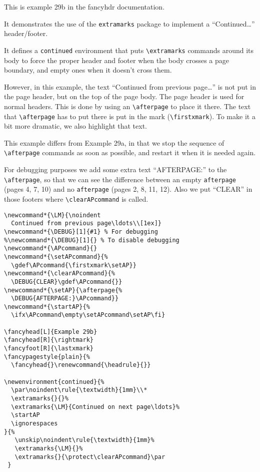 \documentclass{report}
\newcommand*{\LM}{\noindent
  Continued from previous page\ldots\\[1ex]}
\newcommand*{\DEBUG}[1]{#1} %
\newcommand*{\APcommand}{}
\newcommand*{\setAPcommand}{%
  \gdef\APcommand{\firstxmark\setAP}}
\newcommand*{\clearAPcommand}{%
  \DEBUG{CLEAR}\gdef\APcommand{}}
\newcommand*{\setAP}{\afterpage{%
  \DEBUG{AFTERPAGE:}\APcommand}}
\newcommand*{\startAP}{%
  \ifx\APcommand\empty\setAPcommand\setAP\fi}
\begin{document}
\tableofcontents

\thispagestyle{plain}

\bigskip

\noindent
\begin{boxedminipage}{\textwidth}
This is example 29b in the fancyhdr documentation.

It demonstrates the use of the \texttt{extramarks} package to implement
a ``Continued\ldots'' header/footer.

It defines a \texttt{continued} environment that puts \verb|\extramarks| commands around its body to force the proper header and footer when the body crosses a page boundary, and empty ones when it doesn't cross them.

However, in this example, the text ``Continued from previous page\ldots'' is not put in the page header, but on the top of the page body. The page header is used for normal headers. This is done by using an \verb|\afterpage| to place it there. The text that \verb|\afterpage| has to put there is put in the mark (\verb|\firstxmark|). To make it a bit more dramatic, we also highlight that text.

This example differs from Example 29a, in that we stop the sequence of \verb|\afterpage| commands as soon as possible, and restart it when it is needed again.
\end{boxedminipage}

\noindent
\begin{boxedminipage}{\textwidth}
For debugging purposes we add some extra text ``AFTERPAGE:'' to the \verb|\afterpage|, so that we can see the difference between an empty \texttt{afterpage} (pages 4, 7, 10) and no \texttt{afterpage} (pages 2, 8, 11, 12). Also we put ``CLEAR'' in those footers where \verb|\clearAPcommand| is called.

\begin{verbatim}
\newcommand*{\LM}{\noindent
  Continued from previous page\ldots\\[1ex]}
\newcommand*{\DEBUG}[1]{#1} % For debugging
%\newcommand*{\DEBUG}[1]{} % To disable debugging
\newcommand*{\APcommand}{}
\newcommand*{\setAPcommand}{%
  \gdef\APcommand{\firstxmark\setAP}}
\newcommand*{\clearAPcommand}{%
  \DEBUG{CLEAR}\gdef\APcommand{}}
\newcommand*{\setAP}{\afterpage{%
  \DEBUG{AFTERPAGE:}\APcommand}}
\newcommand*{\startAP}{%
  \ifx\APcommand\empty\setAPcommand\setAP\fi}

\fancyhead[L]{Example 29b}
\fancyhead[R]{\rightmark}
\fancyfoot[R]{\lastxmark}
\fancypagestyle{plain}{%
  \fancyhead{}\renewcommand{\headrule}{}}

\newenvironment{continued}{%
  \par\noindent\rule{\textwidth}{1mm}\\*
  \extramarks{}{}%
  \extramarks{\LM}{Continued on next page\ldots}%
  \startAP
  \ignorespaces
}{%
   \unskip\noindent\rule{\textwidth}{1mm}%
   \extramarks{\LM}{}%
   \extramarks{}{\protect\clearAPcommand}\par
 }
\end{verbatim}

\end{boxedminipage}
\end{document}
